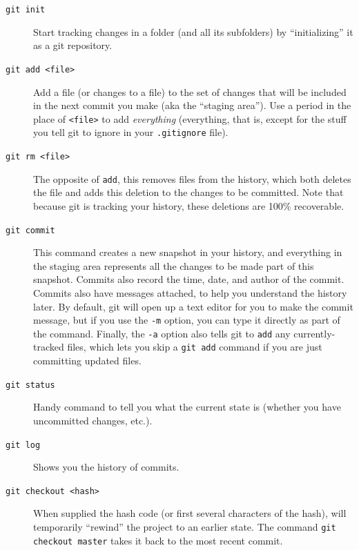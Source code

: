 \documentclass{article}
\begin{document}
\begin{description}
\item[\texttt{git init}] Start tracking changes in a folder (and all its subfolders) by ``initializing'' it as a git repository.
\item[\texttt{git add <file>}] Add a file (or changes to a file) to the set of changes that will be included in the next commit you make (aka the ``staging area'').  Use a period in the place of \texttt{<file>} to add \emph{everything} (everything, that is, except for the stuff you tell git to ignore in your \texttt{.gitignore} file).
\item[\texttt{git rm <file>}] The opposite of \texttt{add}, this removes files from the history, which both deletes the file and adds this deletion to the changes to be committed. Note that because git is tracking your history, these deletions are 100\% recoverable.
\item[\texttt{git commit}] This command creates a new snapshot in your history, and everything in the staging area represents all the changes to be made part of this snapshot.  Commits also record the time, date, and author of the commit. Commits also have messages attached, to help you understand the history later. By default, git will open up a text editor for you to make the commit message, but if you use the \texttt{-m} option, you can type it directly as part of the command. Finally, the \texttt{-a} option also tells git to \texttt{add} any currently-tracked files, which lets you skip a \texttt{git add} command if you are just committing updated files.
\item[\texttt{git status}] Handy command to tell you what the current state is (whether you have uncommitted changes, etc.).
\item[\texttt{git log}] Shows you the history of commits.
\item[\texttt{git checkout <hash>}] When supplied the hash code (or first several characters of the hash), will temporarily ``rewind'' the project to an earlier state. The command \texttt{git checkout master} takes it back to the most recent commit.
\end{description}
\end{document}
